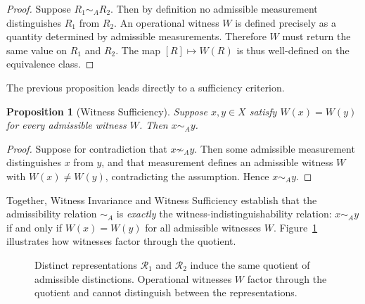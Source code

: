 \documentclass[12pt]{article}
\newtheorem{proposition}[theorem]{Proposition}
\begin{document}
\begin{proof}
Suppose $R_1 \sim_A R_2$. Then by definition no admissible measurement distinguishes $R_1$ from $R_2$. An operational witness $W$ is defined precisely as a quantity determined by admissible measurements. Therefore $W$ must return the same value on $R_1$ and $R_2$. The map $[R] \mapsto W(R)$ is thus well-defined on the equivalence class.
\end{proof}

The previous proposition leads directly to a sufficiency criterion.

\begin{proposition}[Witness Sufficiency]
\label{prop:witness-suff}
Suppose $x, y \in X$ satisfy $W(x) = W(y)$ for every admissible witness $W$. Then $x \sim_A y$.
\end{proposition}

\begin{proof}
Suppose for contradiction that $x \not\sim_A y$. Then some admissible measurement distinguishes $x$ from $y$, and that measurement defines an admissible witness $W$ with $W(x) \neq W(y)$, contradicting the assumption. Hence $x \sim_A y$.
\end{proof}

Together, Witness Invariance and Witness Sufficiency establish that the admissibility relation $\sim_A$ is \emph{exactly} the witness-indistinguishability relation: $x \sim_A y$ if and only if $W(x) = W(y)$ for all admissible witnesses $W$. Figure~\ref{fig:witnesses} illustrates how witnesses factor through the quotient.

\begin{figure}[ht]
\centering
{}
\caption{Distinct representations $\mathcal{R}_1$ and $\mathcal{R}_2$ induce
the same quotient of admissible distinctions. Operational witnesses $W$ factor
through the quotient and cannot distinguish between the representations.}
\label{fig:witnesses}
\end{figure}
\end{document}
